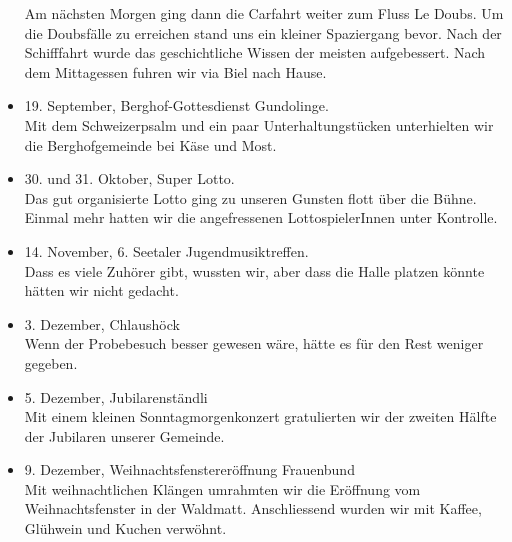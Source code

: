 \begin{history}
\begin{itemize}
        Am nächsten Morgen ging dann die Carfahrt weiter zum Fluss Le Doubs. Um
        die Doubsfälle zu erreichen stand uns ein kleiner Spaziergang bevor.
        Nach der Schifffahrt wurde das geschichtliche Wissen der meisten
        aufgebessert. Nach dem Mittagessen fuhren wir via Biel nach Hause.

        \item[]19. September, Berghof-Gottesdienst Gundolinge.\\
        Mit dem Schweizerpsalm und ein paar
        Unterhaltungstücken unterhielten wir die  Berghofgemeinde bei Käse und
        Most.

        \item[]30. und 31. Oktober, Super Lotto.\\
        Das gut organisierte Lotto ging zu
        unseren Gunsten flott über die Bühne. Einmal mehr hatten wir die
        angefressenen LottospielerInnen unter Kontrolle.

        \item[]14. November, 6. Seetaler Jugendmusiktreffen.\\
        Dass es viele Zuhörer gibt, wussten wir, aber dass die Halle platzen
        könnte hätten wir nicht gedacht.

        \item[]3. Dezember, Chlaushöck\\
        Wenn der Probebesuch besser gewesen wäre, hätte es für den
        Rest weniger gegeben.

        \item[]5. Dezember, Jubilarenständli\\
        Mit einem kleinen Sonntagmorgenkonzert gratulierten wir der zweiten
        Hälfte der Jubilaren unserer Gemeinde.

        \item[]9. Dezember, Weihnachtsfenstereröffnung Frauenbund\\
        Mit weihnachtlichen Klängen
        umrahmten wir die Eröffnung vom Weihnachtsfenster in der Waldmatt.
        Anschliessend wurden wir mit Kaffee, Glühwein und Kuchen verwöhnt.

    \end{itemize}

\end{history}
